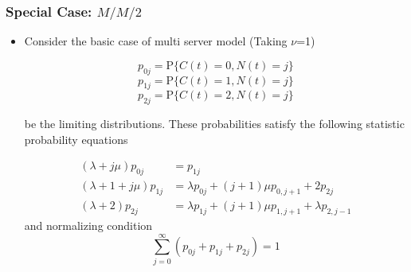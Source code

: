 \documentclass{beamer}
\def \mp {\pause}
\def \mp {}
\newcommand{\ft}[1]{\frametitle{#1}}
\begin{document}
\begin{frame}
 \ft{Special Case: $M/M/2$}
\begin{itemize}\setlength\itemsep{.4em}

\mp \item Consider the basic case of multi server model (Taking $\nu$=1)

\[ p_{0 j}=\mathrm{P}\{C(t)=0, N(t)=j\}\]
\[ p_{1 j}=\mathrm{P}\{C(t)=1, N(t)=j\} \]
\[p_{2 j}=\mathrm{P}\{C(t)=2, N(t)=j\}\]


be the limiting distributions. These probabilities satisfy the following statistic probability equations


\begin{align*}
(\lambda+j \mu) p_{0 j} & =p_{1 j} \\
(\lambda+1+j \mu) p_{1 j} & =\lambda p_{0 j}+(j+1) \mu p_{0, j+1}+2 p_{2 j}  \\
(\lambda+2) p_{2 j} & =\lambda p_{1 j}+(j+1) \mu p_{1, j+1}+\lambda p_{2, j-1} 
\end{align*}
and normalizing condition
\[\sum_{j=0}^{\infty}\left(p_{0 j}+p_{1 j}+p_{2 j}\right)=1 \]
\end{itemize}
\end{frame}
\end{document}
